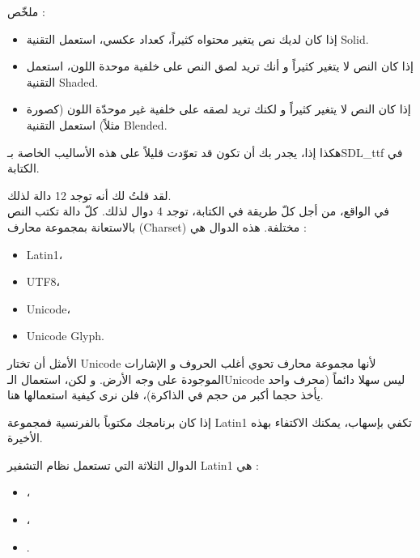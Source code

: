 
ملخّص :

\begin{itemize}
	\item إذا كان لديك نص يتغير محتواه كثيراً، كعداد عكسي، استعمل التقنية 
	\textenglish{Solid}.
	\item إذا كان النص لا يتغير كثيراً و أنك تريد لصق النص على خلفية موحدة اللون، استعمل التقنية 
	\textenglish{Shaded}.
	\item إذا كان النص لا يتغير كثيراً و لكنك تريد لصقه على خلفية غير موحدّة اللون (كصورة مثلاً) استعمل التقنية 
	\textenglish{Blended}.
\end{itemize}

هكذا إذا، يجدر بك أن تكون قد تعوّدت قليلاً على هذه الأساليب الخاصة بـ\textenglish{SDL\_ttf}
في الكتابة.

لقد قلتُ لك أنه توجد 12 دالة لذلك.\\
في الواقع، من أجل كلّ طريقة في الكتابة، توجد 4 دوال لذلك. كلّ دالة تكتب النص بالاستعانة بمجموعة محارف 
(\textenglish{Charset})
مختلفة. هذه الدوال هي :

\begin{itemize}
	\item \textenglish{Latin1}،
	\item \textenglish{UTF8}،
	\item \textenglish{Unicode}،
	\item \textenglish{Unicode Glyph}.
\end{itemize}

الأمثل أن تختار
\textenglish{Unicode}
لأنها مجموعة محارف تحوي أغلب الحروف و الإشارات الموجودة على وجه الأرض. و لكن، استعمال الـ\textenglish{Unicode}
ليس سهلا دائماً (محرف واحد يأخذ حجما أكبر من حجم
في الذاكرة)، فلن نرى كيفية استعمالها هنا.

إذا كان برنامجك مكتوباً بالفرنسية فمجموعة
\textenglish{Latin1}
تكفي بإسهاب، يمكنك الاكتفاء بهذه الأخيرة.

الدوال الثلاثة التي تستعمل نظام التشفير
\textenglish{Latin1}
هي :

\begin{itemize}
	\item {}،
	\item {}،
	\item {}.
\end{itemize}

